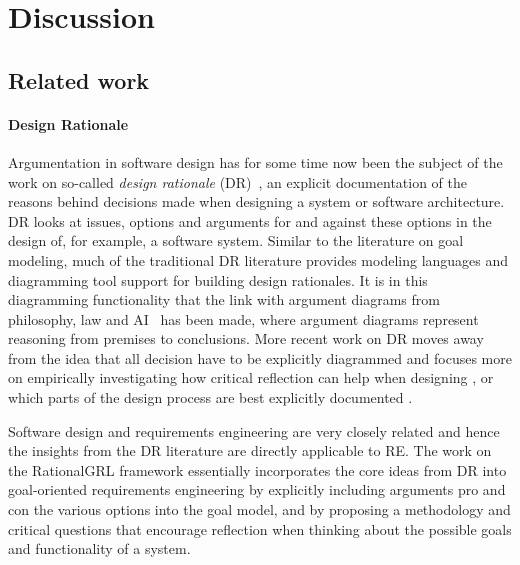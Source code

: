 \section{Discussion}
\label{sect:discussion}

\subsection{Related work}
\label{sect:discussions:relatedwork}

\paragraph{Design Rationale} Argumentation in software design has for some time now been the subject of the work on so-called \emph{design rationale} (DR)~\cite{shum2006hypermedia}, an explicit documentation of the reasons behind decisions made when designing a system or software architecture. DR looks at issues, options and arguments for and against these options in the design of, for example, a software system. Similar to the literature on goal modeling, much of the traditional DR literature provides modeling languages and diagramming tool support for building design rationales. It is in this diagramming functionality that the link with argument diagrams from philosophy, law and AI~\cite{reed2004araucaria,gordon2007visualizing} has been made, where argument diagrams represent reasoning from premises to conclusions. More recent work on DR moves away from the idea that all decision have to be explicitly diagrammed and focuses more on empirically investigating how critical reflection can help when designing \cite{razavian2016two,SchriekEtal2016}, or which parts of the design process are best explicitly documented \cite{falessi2013value}. 

Software design and requirements engineering are very closely related \cite{nuseibeh2001weaving} and hence the insights from the DR literature are directly applicable to RE. The work on the RationalGRL framework essentially incorporates the core ideas from DR into goal-oriented requirements engineering by explicitly including arguments pro and con the various options into the goal model, and by proposing a methodology and critical questions that encourage reflection when thinking about the possible goals and functionality of a system. 

